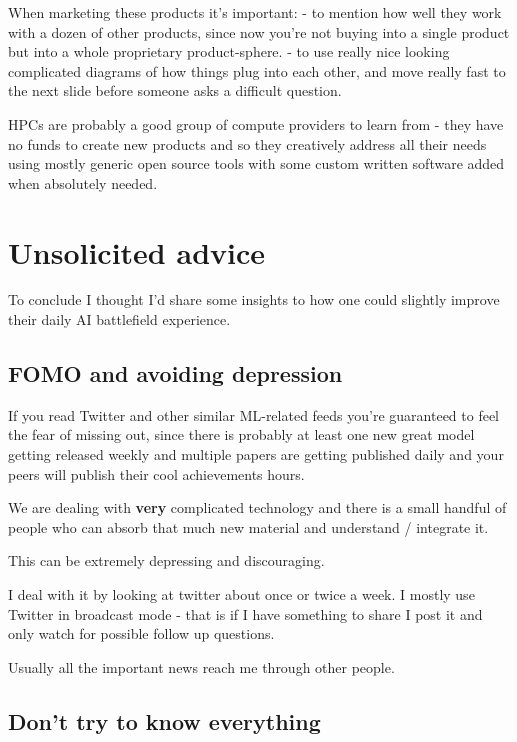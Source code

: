 \documentclass[
]{report}
\begin{document}
When marketing these products it's important: - to mention how well they
work with a dozen of other products, since now you're not buying into a
single product but into a whole proprietary product-sphere. - to use
really nice looking complicated diagrams of how things plug into each
other, and move really fast to the next slide before someone asks a
difficult question.

HPCs are probably a good group of compute providers to learn from - they
have no funds to create new products and so they creatively address all
their needs using mostly generic open source tools with some custom
written software added when absolutely needed.

\section{Unsolicited advice}\label{unsolicited-advice}

To conclude I thought I'd share some insights to how one could slightly
improve their daily AI battlefield experience.

\subsection{FOMO and avoiding
depression}\label{fomo-and-avoiding-depression}

If you read Twitter and other similar ML-related feeds you're guaranteed
to feel the fear of missing out, since there is probably at least one
new great model getting released weekly and multiple papers are getting
published daily and your peers will publish their cool achievements
hours.

We are dealing with \textbf{very} complicated technology and there is a
small handful of people who can absorb that much new material and
understand / integrate it.

This can be extremely depressing and discouraging.

I deal with it by looking at twitter about once or twice a week. I
mostly use Twitter in broadcast mode - that is if I have something to
share I post it and only watch for possible follow up questions.

Usually all the important news reach me through other people.

\subsection{Don't try to know
everything}\label{dont-try-to-know-everything}
\end{document}
